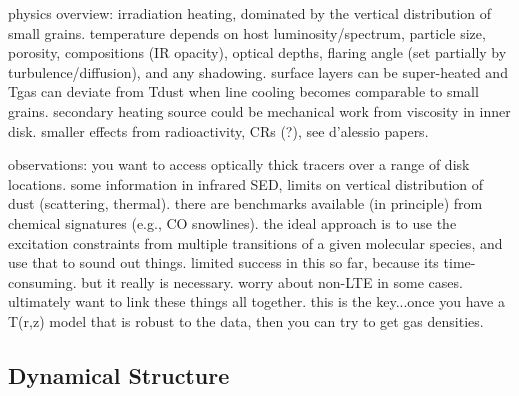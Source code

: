 \documentclass[a4paper]{ar-1col}
\begin{document}
physics overview: irradiation heating, dominated by the vertical distribution of small grains.  temperature depends on host luminosity/spectrum, particle size, porosity, compositions (IR opacity), optical depths, flaring angle (set partially by turbulence/diffusion), and any shadowing.  surface layers can be super-heated and Tgas can deviate from Tdust when line cooling becomes comparable to small grains.  secondary heating source could be mechanical work from viscosity in inner disk.  smaller effects from radioactivity, CRs (?), see d'alessio papers.


observations: you want to access optically thick tracers over a range of disk locations.  some information in infrared SED, limits on vertical distribution of dust (scattering, thermal).  there are benchmarks available (in principle) from chemical signatures (e.g., CO snowlines).  the ideal approach is to use the excitation constraints from multiple transitions of a given molecular species, and use that to sound out things.  limited success in this so far, because its time-consuming.  but it really is necessary.  worry about non-LTE in some cases.  ultimately want to link these things all together.  this is the key...once you have a T(r,z) model that is robust to the data, then you can try to get gas densities.



\subsection{Dynamical Structure} \label{sec:turb}
\end{document}
